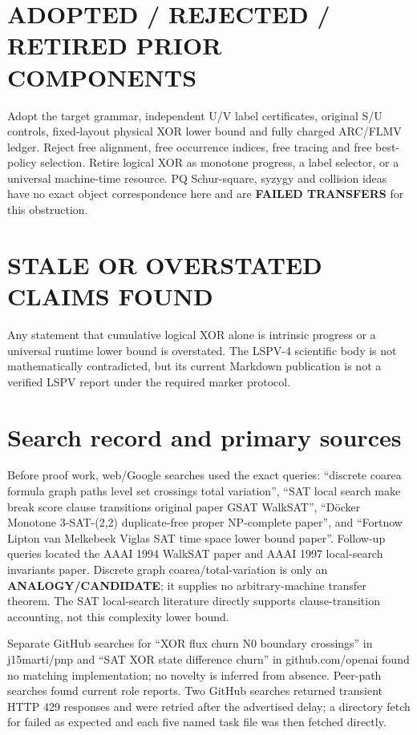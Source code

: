 \documentclass[11pt]{article}
\begin{document}
\section{ADOPTED / REJECTED / RETIRED PRIOR COMPONENTS}
Adopt the target grammar, independent U/V label certificates, original S/U
controls, fixed-layout physical XOR lower bound and fully charged ARC/FLMV
ledger.  Reject free alignment, free occurrence indices, free tracing and free
best-policy selection.  Retire logical XOR as monotone progress, a label
selector, or a universal machine-time resource.  PQ Schur-square, syzygy and
collision ideas have no exact object correspondence here and are
\textbf{FAILED TRANSFERS} for this obstruction.

\section{STALE OR OVERSTATED CLAIMS FOUND}
Any statement that cumulative logical XOR alone is intrinsic progress or a
universal runtime lower bound is overstated.  The LSPV-4 scientific body is not
mathematically contradicted, but its current Markdown publication is not a
verified LSPV report under the required marker protocol.

\section{Search record and primary sources}
Before proof work, web/Google searches used the exact queries: ``discrete coarea
formula graph paths level set crossings total variation'', ``SAT local search
make break score clause transitions original paper GSAT WalkSAT'', ``D\"ocker
Monotone 3-SAT-(2,2) duplicate-free proper NP-complete paper'', and ``Fortnow
Lipton van Melkebeek Viglas SAT time space lower bound paper''.  Follow-up
queries located the AAAI 1994 WalkSAT paper and AAAI 1997 local-search
invariants paper.  Discrete graph coarea/total-variation is only an
\textbf{ANALOGY/CANDIDATE}; it supplies no arbitrary-machine transfer theorem.
The SAT local-search literature directly supports clause-transition accounting,
not this complexity lower bound.

Separate GitHub searches for ``XOR flux churn N0 boundary crossings'' in
j15marti/pnp and ``SAT XOR state difference churn'' in github.com/openai found
no matching implementation; no novelty is inferred from absence.  Peer-path
searches found current role reports.  Two GitHub searches returned transient
HTTP 429 responses and were retried after the advertised delay; a directory
fetch for  failed as expected and each five named task file was
then fetched directly.
\end{document}

